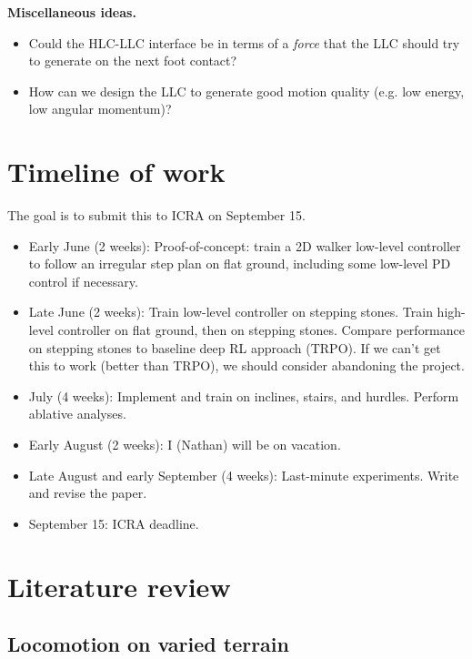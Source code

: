 \documentclass[a4paper]{article}
\begin{document}
\textbf{Miscellaneous ideas.}
\begin{itemize}
  \item Could the HLC-LLC interface be in terms of a \emph{force} that the LLC should try to generate on the next foot contact?
  \item How can we design the LLC to generate good motion quality (e.g. low energy, low angular momentum)?
\end{itemize}

\section{Timeline of work}

The goal is to submit this to ICRA on September 15.

\begin{itemize}
  \item Early June (2 weeks): Proof-of-concept: train a 2D walker low-level controller to follow an irregular step plan on flat ground, including some low-level PD control if necessary.
  \item Late June (2 weeks): Train low-level controller on stepping stones.
    Train high-level controller on flat ground, then on stepping stones.
    Compare performance on stepping stones to baseline deep RL approach (TRPO).
    If we can't get this to work (better than TRPO), we should consider abandoning the project.
  \item July (4 weeks): Implement and train on inclines, stairs, and hurdles.
    Perform ablative analyses.
  \item Early August (2 weeks): I (Nathan) will be on vacation.
  \item Late August and early September (4 weeks): Last-minute experiments.
    Write and revise the paper.
  \item September 15: ICRA deadline.
\end{itemize}

\section{Literature review}

\subsection*{Locomotion on varied terrain}
\end{document}
